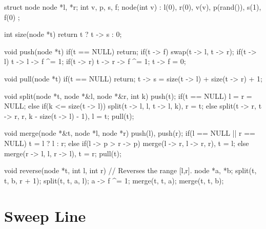 \begin{mylstlisting}[language=C++]
struct node {
  node *l, *r;
  int v, p, s, f;
  node(int v) : l(0), r(0), v(v), p(rand()), s(1), f(0) {}
};

int size(node *t){
  return t ? t -> s : 0;
}

void push(node *t){
  if(t == NULL) return;
  if(t -> f){
    swap(t -> l, t -> r);
    if(t -> l) t -> l -> f ^= 1;
    if(t -> r) t -> r -> f ^= 1;
    t -> f = 0;
  }
}

void pull(node *t){
  if(t == NULL) return;
  t -> s = size(t -> l) + size(t -> r) + 1;
}

void split(node *t, node *&l, node *&r, int k){
  push(t);
  if(t == NULL) l = r = NULL;
  else if(k <= size(t -> l)) split(t -> l, l, t -> l, k), r = t;
  else split(t -> r, t -> r, r, k - size(t -> l) - 1), l = t;
  pull(t);
}

void merge(node *&t, node *l, node *r){
  push(l), push(r);
  if(l == NULL || r == NULL) t = l ? l : r;
  else if(l -> p > r -> p) merge(l -> r, l -> r, r), t = l;
  else merge(r -> l, l, r -> l), t = r;
  pull(t);
}

void reverse(node *t, int l, int r){
  // Reverses the range [l,r].
  node *a, *b;
  split(t, t, b, r + 1);
  split(t, t, a, l);
  a -> f ^= 1;
  merge(t, t, a);
  merge(t, t, b);
}
\end{mylstlisting}

\section{Sweep Line}

